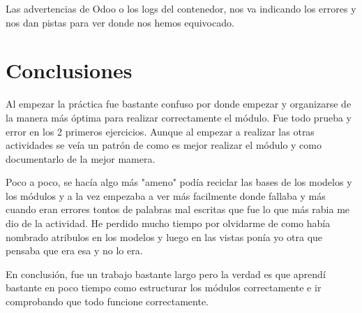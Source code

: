\documentclass[a4paper,12pt]{article}
\begin{document}
Las advertencias de Odoo o los logs del contenedor, nos va indicando los errores y nos dan pistas para ver donde nos hemos equivocado.


\vspace{5cm}
\section{Conclusiones}

Al empezar la práctica fue bastante confuso por donde empezar y organizarse de la manera más óptima para realizar correctamente el módulo. Fue todo prueba y error en los 2 primeros ejercicios. Aunque al empezar a realizar las otras actividades se veía un patrón de como es mejor realizar el módulo y como documentarlo de la mejor mamera.

Poco a poco, se hacía algo más "ameno" podía reciclar las bases de los modelos y los módulos y a la vez empezaba a ver más facilmente donde fallaba y más cuando eran errores tontos de palabras mal escritas que fue lo que más rabia me dio de la actividad. He perdido mucho tiempo por olvidarme de como había nombrado atribulos en los modelos y luego en las vistas ponía yo otra que pensaba que era esa y no lo era. 

En conclusión, fue un trabajo bastante largo pero la verdad es que aprendí bastante en poco tiempo como estructurar los módulos correctamente e ir comprobando que todo funcione correctamente.
\end{document}
